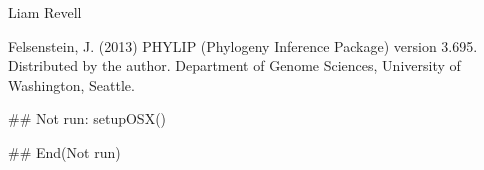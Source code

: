 \documentclass[a4paper]{book}
\begin{document}
%
\begin{Author}\relax
Liam Revell 
\end{Author}
%
\begin{References}\relax
Felsenstein, J. (2013) PHYLIP (Phylogeny Inference Package) version 3.695. Distributed by the author. Department of Genome Sciences, University of Washington, Seattle.
\end{References}
%
\begin{Examples}
\begin{ExampleCode}
## Not run: 
setupOSX()

## End(Not run)
\end{ExampleCode}
\end{Examples}
\printindex{}
\end{document}
